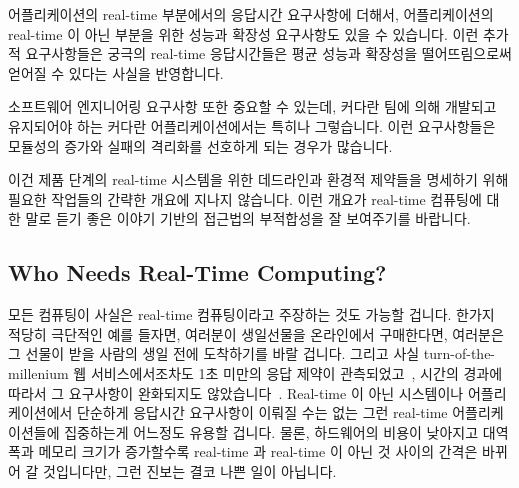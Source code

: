 어플리케이션의 real-time 부분에서의 응답시간 요구사항에 더해서, 어플리케이션의
real-time 이 아닌 부분을 위한 성능과 확장성 요구사항도 있을 수 있습니다.
이런 추가적 요구사항들은 궁극의 real-time 응답시간들은 평균 성능과 확장성을
떨어뜨림으로써 얻어질 수 있다는 사실을 반영합니다.

소프트웨어 엔지니어링 요구사항 또한 중요할 수 있는데, 커다란 팀에 의해 개발되고
유지되어야 하는 커다란 어플리케이션에서는 특히나 그렇습니다.
이런 요구사항들은 모듈성의 증가와 실패의 격리화를 선호하게 되는 경우가
많습니다.

이건 제품 단계의 real-time 시스템을 위한 데드라인과 환경적 제약들을 명세하기
위해 필요한 작업들의 간략한 개요에 지나지 않습니다.
이런 개요가 real-time 컴퓨팅에 대한 말로 듣기 좋은 이야기 기반의 접근법의
부적합성을 잘 보여주기를 바랍니다.

\subsection{Who Needs Real-Time Computing?}
\label{sec:advsync:Who Needs Real-Time Computing?}

모든 컴퓨팅이 사실은 real-time 컴퓨팅이라고 주장하는 것도 가능할 겁니다.
한가지 적당히 극단적인 예를 들자면, 여러분이 생일선물을 온라인에서 구매한다면,
여러분은 그 선물이 받을 사람의 생일 전에 도착하기를 바랄 겁니다.
그리고 사실 turn-of-the-millenium 웹 서비스에서조차도 1초 미만의 응답 제약이
관측되었고~\cite{KristofferBohmann2001a}, 시간의 경과에 따라서 그 요구사항이
완화되지도 않았습니다~\cite{DeCandia:2007:DAH:1323293.1294281}.
Real-time 이 아닌 시스템이나 어플리케이션에서 단순하게 응답시간 요구사항이
이뤄질 수는 없는 그런 real-time 어플리케이션들에 집중하는게 어느정도 유용할
겁니다.
물론, 하드웨어의 비용이 낮아지고 대역폭과 메모리 크기가 증가할수록 real-time 과
real-time 이 아닌 것 사이의 간격은 바뀌어 갈 것입니다만, 그런 진보는 결코
나쁜 일이 아닙니다.
\iffalse

